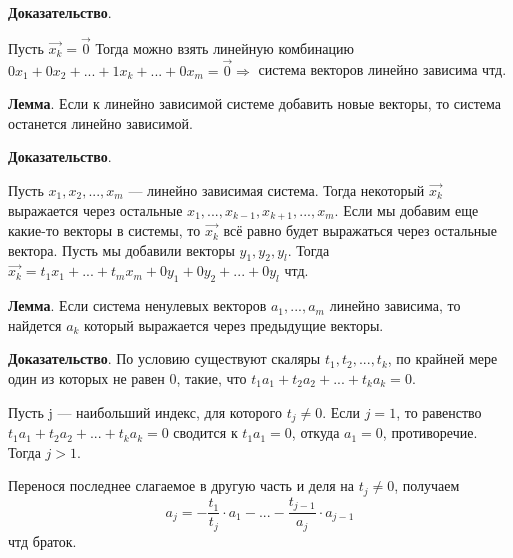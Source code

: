 \documentclass[a4paper]{article}
\begin{document}
    \begin{hproof}
        \textbf{Доказательство}.

        Пусть $\vec{x_k} = \vec{0}$
        Тогда можно взять линейную комбинацию $0x_1 + 0x_2 + ... + 1x_k + ... + 0x_m = \vec{0} \Rightarrow$ система векторов линейно зависима чтд.

    \end{hproof}


    \begin{htheorem}
        \textbf{Лемма}. Если к линейно зависимой системе добавить новые векторы, то система останется линейно зависимой.
    \end{htheorem}

    \begin{hproof}
        \textbf{Доказательство}.

        Пусть  $x_1, x_2, ..., x_m$ --- линейно зависимая система. Тогда некоторый $\vec{x_k}$ выражается через остальные $x_1, ..., x_{k-1}, x_{k+1}, ..., x_m$. Если мы добавим еще какие-то векторы в системы, то $\vec{x_k}$ всё равно будет выражаться через остальные вектора. Пусть мы добавили векторы $y_1, y_2, y_l$. Тогда $\vec{x_k} = t_1x_1 + ... + t_mx_m + 0y_1 +0y_2 + ... + 0y_l$ чтд.
    \end{hproof}

    \begin{htheorem}
        \textbf{Лемма}. Если система ненулевых векторов $a_1, ..., a_m$ линейно зависима, то найдется $a_k$ который выражается через предыдущие векторы.
    \end{htheorem}

    \begin{hproof}
        \textbf{Доказательство}. По условию существуют скаляры $t_1, t_2, ..., t_k$, по крайней мере один из которых не равен 0, такие, что $t_1a_1 + t_2a_2 + ... + t_ka_k = 0$.

        Пусть j --- наибольший индекс, для которого $t_j \neq 0$. Если $j=1$, то равенство \newline  $t_1a_1 + t_2a_2 + ... + t_ka_k = 0$ сводится к $t_1a_1 = 0$, откуда $a_1 = 0$, противоречие. Тогда $j>1$.

        Перенося последнее слагаемое в другую часть и деля на $t_j \neq 0$, получаем \begin{equation}
                                                                                        \displaystyle a_j = -\frac{t_1}{t_j}\cdot a_1 - ... - \frac{t_{j-1}}{a_j} \cdot a_{j-1}
        \end{equation}
        чтд браток.
    \end{hproof}
\end{document}
